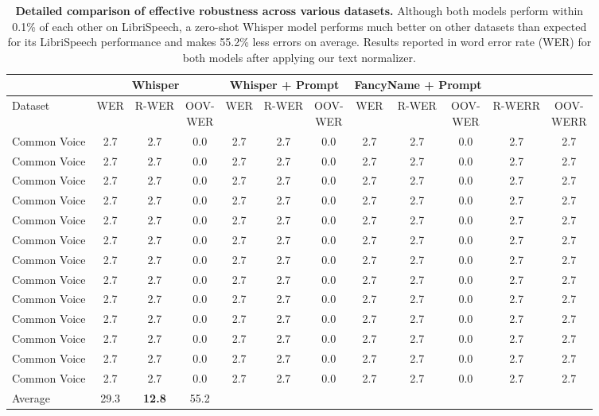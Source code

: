\begin{table*}[t]
\vskip 0.15in
\small
\begin{center}
\begin{tabular}{l|ccc|ccc|ccc|cc}
\toprule
 &
\multicolumn{3}{c|}{Whisper} &
\multicolumn{3}{c|}{Whisper + Prompt} &
\multicolumn{3}{c|}{FancyName + Prompt} \\
\midrule
 Dataset & WER & R-WER & \CellWithForceBreak{OOV-\\WER}
 & WER & R-WER & \CellWithForceBreak{OOV-\\WER} & WER & R-WER & \CellWithForceBreak{OOV-\\WER} & R-WERR & \CellWithForceBreak{OOV-\\WERR} \\

\midrule
Common Voice & 2.7 & 2.7 & 0.0 & 2.7 & 2.7 & 0.0 & 2.7 & 2.7 & 0.0 & 2.7 & 2.7 \\
Common Voice & 2.7 & 2.7 & 0.0 & 2.7 & 2.7 & 0.0 & 2.7 & 2.7 & 0.0 & 2.7 & 2.7 \\
Common Voice & 2.7 & 2.7 & 0.0 & 2.7 & 2.7 & 0.0 & 2.7 & 2.7 & 0.0 & 2.7 & 2.7 \\
Common Voice & 2.7 & 2.7 & 0.0 & 2.7 & 2.7 & 0.0 & 2.7 & 2.7 & 0.0 & 2.7 & 2.7 \\
Common Voice & 2.7 & 2.7 & 0.0 & 2.7 & 2.7 & 0.0 & 2.7 & 2.7 & 0.0 & 2.7 & 2.7 \\
Common Voice & 2.7 & 2.7 & 0.0 & 2.7 & 2.7 & 0.0 & 2.7 & 2.7 & 0.0 & 2.7 & 2.7 \\
Common Voice & 2.7 & 2.7 & 0.0 & 2.7 & 2.7 & 0.0 & 2.7 & 2.7 & 0.0 & 2.7 & 2.7 \\
Common Voice & 2.7 & 2.7 & 0.0 & 2.7 & 2.7 & 0.0 & 2.7 & 2.7 & 0.0 & 2.7 & 2.7 \\
Common Voice & 2.7 & 2.7 & 0.0 & 2.7 & 2.7 & 0.0 & 2.7 & 2.7 & 0.0 & 2.7 & 2.7 \\
Common Voice & 2.7 & 2.7 & 0.0 & 2.7 & 2.7 & 0.0 & 2.7 & 2.7 & 0.0 & 2.7 & 2.7 \\
Common Voice & 2.7 & 2.7 & 0.0 & 2.7 & 2.7 & 0.0 & 2.7 & 2.7 & 0.0 & 2.7 & 2.7 \\
Common Voice & 2.7 & 2.7 & 0.0 & 2.7 & 2.7 & 0.0 & 2.7 & 2.7 & 0.0 & 2.7 & 2.7 \\
Common Voice & 2.7 & 2.7 & 0.0 & 2.7 & 2.7 & 0.0 & 2.7 & 2.7 & 0.0 & 2.7 & 2.7 \\
\midrule
Average & 29.3 & \textbf{12.8} & \color{Highlight}55.2 \\

\bottomrule
\end{tabular}
\caption{\textbf{Detailed comparison of effective robustness across various datasets.} Although both models perform within 0.1\% of each other on LibriSpeech, a zero-shot Whisper model performs much better on other datasets than expected for its LibriSpeech performance and makes 55.2\% less errors on average. Results reported in word error rate (WER) for both models after applying our text normalizer.}
\label{robustness_table}
\end{center}
\vspace{-1em}
\end{table*}
